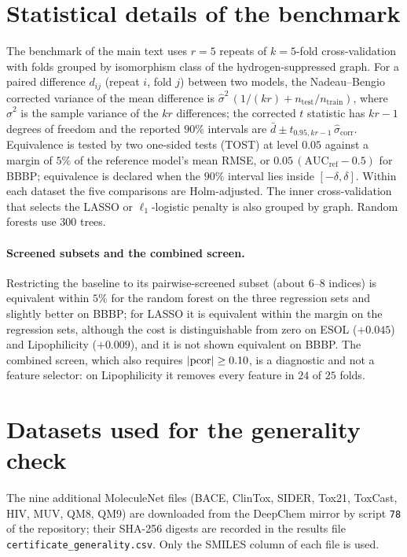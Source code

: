 \section{Statistical details of the benchmark}\label{sup:stats}
The benchmark of the main text uses $r=5$ repeats of $k=5$-fold
cross-validation with folds grouped by isomorphism class of the
hydrogen-suppressed graph. For a paired difference $d_{ij}$ (repeat $i$,
fold $j$) between two models, the Nadeau--Bengio corrected variance of
the mean difference is $\hat\sigma^2\,(1/(kr)+n_{\mathrm{test}}/n_{\mathrm{train}})$,
where $\hat\sigma^2$ is the sample variance of the $kr$ differences; the
corrected $t$ statistic has $kr-1$ degrees of freedom and the reported
$90\%$ intervals are $\bar d\pm t_{0.95,kr-1}\,\hat\sigma_{\mathrm{corr}}$.
Equivalence is tested by two one-sided tests (TOST) at level $0.05$
against a margin of $5\%$ of the reference model's mean RMSE, or
$0.05\,(\mathrm{AUC}_{\mathrm{ref}}-0.5)$ for BBBP; equivalence is
declared when the $90\%$ interval lies inside $[-\delta,\delta]$.
Within each dataset the five comparisons are Holm-adjusted. The
inner cross-validation that selects the LASSO or $\ell_1$-logistic
penalty is also grouped by graph. Random forests use $300$ trees.

\paragraph{Screened subsets and the combined screen.} Restricting the baseline to its pairwise-screened
subset (about $6$--$8$ indices) is equivalent within $5\%$ for the
random forest on the three regression sets and slightly better on BBBP;
for LASSO it is equivalent within the margin on the regression sets,
although the cost is distinguishable from zero on ESOL ($+0.045$) and
Lipophilicity ($+0.009$), and it is not shown equivalent on BBBP.
The combined screen, which also requires $|\mathrm{pcor}|\ge0.10$, is a
diagnostic and not a feature selector: on Lipophilicity it removes every
feature in $24$ of $25$ folds.

\section{Datasets used for the generality check}\label{sup:data}


The nine additional MoleculeNet files (BACE, ClinTox, SIDER, Tox21,
ToxCast, HIV, MUV, QM8, QM9) are downloaded from the DeepChem mirror by
script \texttt{78} of the repository; their SHA-256 digests are recorded
in the results file \texttt{certificate\_generality.csv}. Only the SMILES
column of each file is used.
